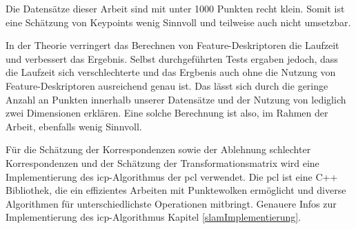 Die Datensätze dieser Arbeit sind mit unter 1000 Punkten recht klein.
Somit ist eine Schätzung von Keypoints wenig Sinnvoll und teilweise auch nicht umsetzbar.

In der Theorie verringert das Berechnen von Feature-Deskriptoren die Laufzeit und verbessert das Ergebnis.
Selbst durchgeführten Tests ergaben jedoch, dass die Laufzeit sich verschlechterte 
und das Ergbenis auch ohne die Nutzung von Feature-Deskriptoren ausreichend genau ist.
Das lässt sich durch die geringe Anzahl an Punkten innerhalb unserer Datensätze und der Nutzung von lediglich zwei Dimensionen erklären.
Eine solche Berechnung ist also, im Rahmen der Arbeit, ebenfalls wenig Sinnvoll.

Für die Schätzung der Korrespondenzen sowie der Ablehnung schlechter Korrespondenzen 
und der Schätzung der Transformationsmatrix wird eine Implementierung des \ac{icp}-Algorithmus der \acf{pcl} verwendet.
Die \ac{pcl} ist eine C++ Bibliothek, die ein effizientes Arbeiten mit Punktewolken ermöglicht
und diverse Algorithmen für unterschiedlichste Operationen mitbringt.
Genauere Infos zur Implementierung des \ac{icp}-Algorithmus Kapitel \ref{slamImplementierung}.

\newpage
